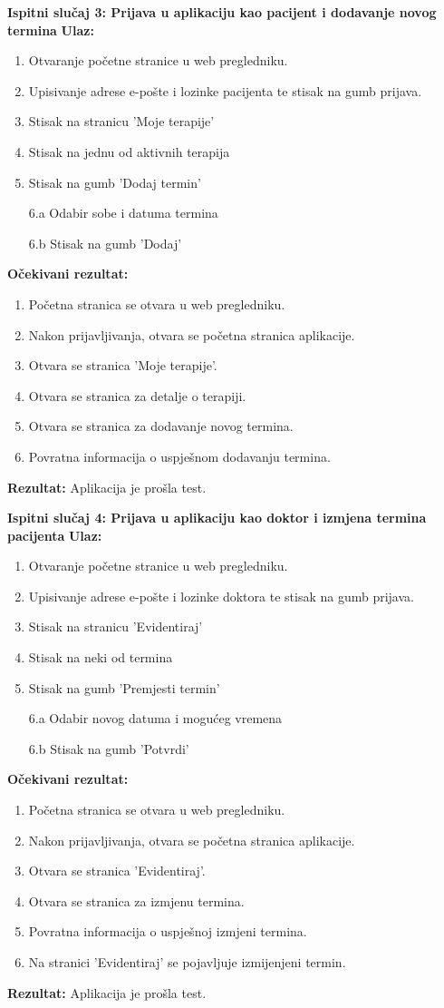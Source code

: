 \textbf{Ispitni slučaj 3: Prijava u aplikaciju kao pacijent i dodavanje novog termina}
\textbf{Ulaz:}
\begin{enumerate}
    \item Otvaranje početne stranice u web pregledniku.
    \item Upisivanje adrese e-pošte i lozinke pacijenta te stisak na gumb prijava.
    \item Stisak na stranicu 'Moje terapije'
    \item Stisak na jednu od aktivnih terapija
    \item Stisak na gumb 'Dodaj termin'
    \item[6.a] Odabir sobe i datuma termina
    \item[6.b] Stisak na gumb 'Dodaj'
\end{enumerate}
\textbf{Očekivani rezultat:}
\begin{enumerate}
    \item Početna stranica se otvara u web pregledniku.
    \item Nakon prijavljivanja, otvara se početna stranica aplikacije.
    \item Otvara se stranica 'Moje terapije'.
    \item Otvara se stranica za detalje o terapiji.
    \item Otvara se stranica za dodavanje novog termina.
    \item Povratna informacija o uspješnom dodavanju termina.
\end{enumerate}
\textbf{Rezultat:} Aplikacija je prošla test.

\textbf{Ispitni slučaj 4: Prijava u aplikaciju kao doktor i izmjena termina pacijenta}
\textbf{Ulaz:}
\begin{enumerate}
    \item Otvaranje početne stranice u web pregledniku.
    \item Upisivanje adrese e-pošte i lozinke doktora te stisak na gumb prijava.
    \item Stisak na stranicu 'Evidentiraj'
    \item Stisak na neki od termina
    \item Stisak na gumb 'Premjesti termin'
    \item[6.a] Odabir novog datuma i mogućeg vremena
    \item[6.b] Stisak na gumb 'Potvrdi'
\end{enumerate}
\textbf{Očekivani rezultat:}
\begin{enumerate}
    \item Početna stranica se otvara u web pregledniku.
    \item Nakon prijavljivanja, otvara se početna stranica aplikacije.
    \item Otvara se stranica 'Evidentiraj'.
    \item Otvara se stranica za izmjenu termina.
    \item Povratna informacija o uspješnoj izmjeni termina.
    \item Na stranici 'Evidentiraj' se pojavljuje izmijenjeni termin.
\end{enumerate}
\textbf{Rezultat:} Aplikacija je prošla test.


